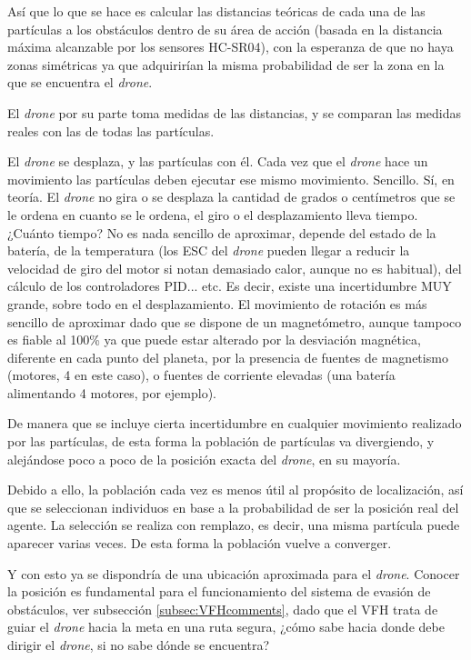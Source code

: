 Así que lo que se hace es calcular las distancias teóricas de cada una de las partículas a los obstáculos dentro de su área de acción (basada en la distancia máxima alcanzable por los sensores HC-SR04), con la esperanza de que no haya zonas simétricas ya que adquirirían la misma probabilidad de ser la zona en la que se encuentra el \emph{drone}.

El \emph{drone} por su parte toma medidas de las distancias, y se comparan las medidas reales con las de todas las partículas. 

El \emph{drone} se desplaza, y las partículas con él. Cada vez que el \emph{drone} hace un movimiento las partículas deben ejecutar ese mismo movimiento. Sencillo. Sí, en teoría. El \emph{drone} no gira o se desplaza la cantidad de grados o centímetros que se le ordena en cuanto se le ordena, el giro o el desplazamiento lleva tiempo. ¿Cuánto tiempo? No es nada sencillo de aproximar, depende del estado de la batería, de la temperatura (los ESC del \emph{drone} pueden llegar a reducir la velocidad de giro del motor si notan demasiado calor, aunque no es habitual), del cálculo de los controladores PID... etc. 
Es decir, existe una incertidumbre MUY grande, sobre todo en el desplazamiento. El movimiento de rotación es más sencillo de aproximar dado que se dispone de un magnetómetro, aunque tampoco es fiable al 100\% ya que puede estar alterado por la desviación magnética, diferente en cada punto del planeta, por la presencia de fuentes de magnetismo (motores, 4 en este caso), o fuentes de corriente elevadas (una batería alimentando 4 motores, por ejemplo).

De manera que se incluye cierta incertidumbre en cualquier movimiento realizado por las partículas, de esta forma la población de partículas va divergiendo, y alejándose poco a poco de la posición exacta del \emph{drone}, en su mayoría. 

Debido a ello, la población cada vez es menos útil al propósito de localización, así que se seleccionan individuos en base a la probabilidad de ser la posición real del agente. 
La selección se realiza con remplazo, es decir, una misma partícula puede aparecer varias veces. De esta forma la población vuelve a converger. 

Y con esto ya se dispondría de una ubicación aproximada para el \emph{drone}. Conocer la posición es fundamental para el funcionamiento del sistema de evasión de obstáculos, ver subsección \ref{subsec:VFHcomments}, dado que el VFH trata de guiar el \emph{drone} hacia la meta en una ruta segura, ¿cómo sabe hacia donde debe dirigir el \emph{drone}, si no sabe dónde se encuentra?

